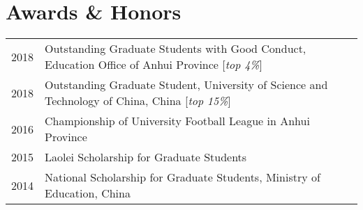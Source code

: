 \section*{Awards \& Honors}

\begin{tabular}{p{} p{}}
2018 & Outstanding Graduate Students with Good Conduct, Education Office of Anhui Province [\textit{top 4\%}] \\
2018 & Outstanding Graduate Student, University of Science and Technology of China, China [\textit{top 15\%}] \\
2016 & Championship of University Football League in Anhui Province \\
2015 & Laolei Scholarship for Graduate Students \\
2014 & National Scholarship for Graduate Students, Ministry of Education, China \\
\end{tabular}
